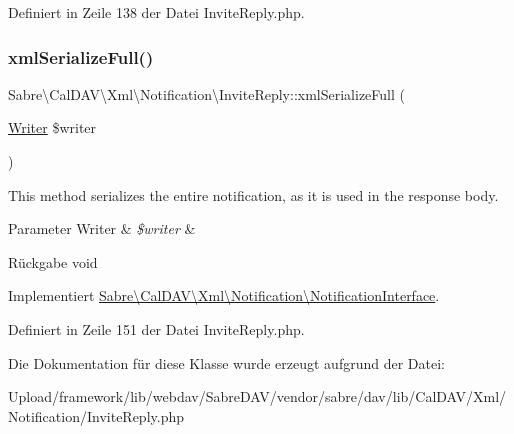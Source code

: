 Definiert in Zeile 138 der Datei Invite\+Reply.\+php.

\mbox{\label{class_sabre_1_1_cal_d_a_v_1_1_xml_1_1_notification_1_1_invite_reply_a19d655167f7347b67647479132df9b6b}} 
\subsubsection{\texorpdfstring{xml\+Serialize\+Full()}{xmlSerializeFull()}}
{\footnotesize\ttfamily Sabre\textbackslash{}\+Cal\+D\+A\+V\textbackslash{}\+Xml\textbackslash{}\+Notification\textbackslash{}\+Invite\+Reply\+::xml\+Serialize\+Full (\begin{DoxyParamCaption}\item[{\mbox{\hyperlink{class_sabre_1_1_xml_1_1_writer}{Writer}}}]{\$writer }\end{DoxyParamCaption})}

This method serializes the entire notification, as it is used in the response body.


\begin{DoxyParams}[1]{Parameter}
Writer & {\em \$writer} & \\
\hline
\end{DoxyParams}
\begin{DoxyReturn}{Rückgabe}
void 
\end{DoxyReturn}


Implementiert \mbox{\hyperlink{interface_sabre_1_1_cal_d_a_v_1_1_xml_1_1_notification_1_1_notification_interface_abb545ebd302b3bdf972d159065c6a8b4}{Sabre\textbackslash{}\+Cal\+D\+A\+V\textbackslash{}\+Xml\textbackslash{}\+Notification\textbackslash{}\+Notification\+Interface}}.



Definiert in Zeile 151 der Datei Invite\+Reply.\+php.



Die Dokumentation für diese Klasse wurde erzeugt aufgrund der Datei\+:\begin{DoxyCompactItemize}
\item 
Upload/framework/lib/webdav/\+Sabre\+D\+A\+V/vendor/sabre/dav/lib/\+Cal\+D\+A\+V/\+Xml/\+Notification/Invite\+Reply.\+php\end{DoxyCompactItemize}
